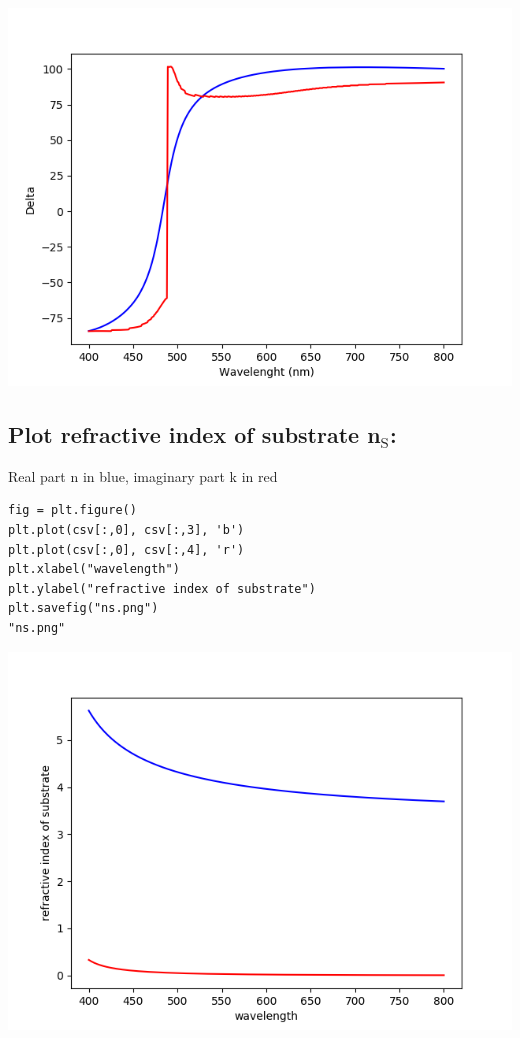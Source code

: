 \documentclass[11pt]{article}
\begin{document}
\begin{center}
\includegraphics[width=.9\linewidth]{delta.png}
\end{center}


\subsection{Plot refractive index of substrate n\(_{\text{S}}\):}
\label{sec:org3cdb376}

Real part n in blue, imaginary part k in red

\begin{verbatim}
fig = plt.figure()
plt.plot(csv[:,0], csv[:,3], 'b')
plt.plot(csv[:,0], csv[:,4], 'r')
plt.xlabel("wavelength")
plt.ylabel("refractive index of substrate")
plt.savefig("ns.png")
"ns.png"
\end{verbatim}

\begin{center}
\includegraphics[width=.9\linewidth]{ns.png}
\end{center}
\end{document}
